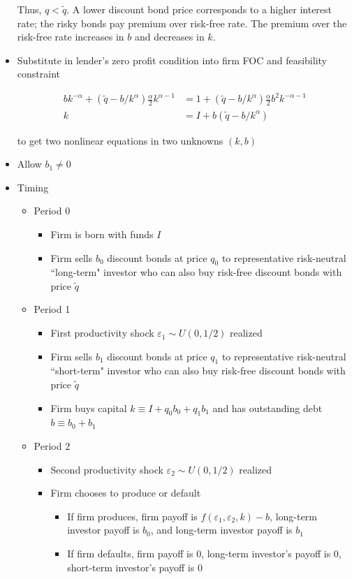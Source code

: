 \documentclass{article}
\begin{document}
\begin{itemize}
Thus, $q < \tilde q$. A lower discount bond price corresponds to a higher interest rate; the risky bonds pay premium over risk-free rate.  The premium over the risk-free rate increases in $b$ and decreases in $k$.


\item Substitute in lender's zero profit condition into firm FOC and feasibility constraint

\begin{align*}
b k^{-\alpha} + (\tilde q - b/k^\alpha)\frac{\alpha}{2} k^{\alpha-1} &= 1 + (\tilde q - b/k^\alpha)\frac{\alpha}{2}b^2 k^{-\alpha-1} \\
 k &= I + b(\tilde q - b/k^\alpha)
\end{align*}

to get two nonlinear equations in two unknowns $(k, b)$

\pagebreak

\item Allow $b_1 \neq 0$

\item Timing

\begin{itemize}
\item Period 0
\begin{itemize}
\item Firm is born with funds $I$
\item Firm sells $b_0$ discount bonds at price $q_0$ to representative risk-neutral ``long-term" investor who can also buy risk-free discount bonds with price $\tilde q$
\end{itemize}
\item Period 1
\begin{itemize}
\item First productivity shock $\varepsilon_1 \sim U(0,1/2)$ realized
\item Firm sells $b_1$ discount bonds at price $q_1$ to representative risk-neutral ``short-term" investor who can also buy risk-free discount bonds with price $\tilde q$
\item Firm buys capital $k \equiv I + q_0 b_0 + q_1 b_1$ and has outstanding debt $b \equiv b_0 + b_1$
\end{itemize}
\item Period 2
\begin{itemize}
\item Second productivity shock $\varepsilon_2 \sim U(0,1/2)$ realized
\item Firm chooses to produce or default
\begin{itemize}
\item If firm produces, firm payoff is $f(\varepsilon_1, \varepsilon_2, k) - b$, long-term investor payoff is $b_0$, and long-term investor payoff is $b_1$
\item If firm defaults, firm payoff is 0, long-term investor's payoff is $0$, short-term investor's payoff is $0$ 
\end{itemize}
\end{itemize}
\end{itemize}


\end{itemize}
\end{document}
